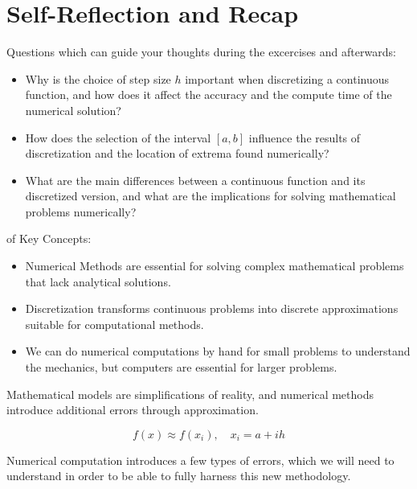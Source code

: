 \section{Self-Reflection and Recap}  

 Questions which can guide your thoughts during the excercises and afterwards:
\begin{itemize}
    \item Why is the choice of step size $h$ important when discretizing a continuous function, and how does it affect the accuracy and the compute time of the numerical solution?
    \item How does the selection of the interval $[a, b]$ influence the results of discretization and the location of extrema found numerically?
    \item What are the main differences between a continuous function and its discretized version, and what are the implications for solving mathematical problems numerically?
\end{itemize}

 of Key Concepts:
\begin{itemize}
    \item Numerical Methods are essential for solving complex mathematical problems that lack analytical solutions.
    \item Discretization transforms continuous problems into discrete approximations suitable for computational methods.
    \item We can do numerical computations by hand for small problems to understand the mechanics, but computers are essential for larger problems.
\end{itemize}


 Mathematical models are simplifications of reality, 
and numerical methods introduce additional errors through approximation.


\begin{equation}
    f(x) \approx f(x_i),\quad x_i = a + i h
\end{equation}

Numerical computation introduces a few types of errors, which we will need to understand in order to 
be able to fully harness this new methodology.





